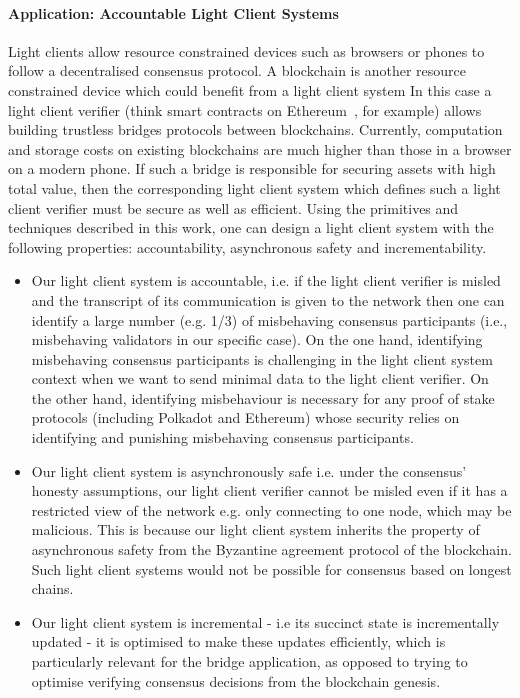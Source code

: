 \paragraph{Application: Accountable Light Client Systems} %
Light clients allow resource constrained devices such as browsers or phones to follow a decentralised 
consensus protocol. A blockchain is another resource constrained device which could benefit from a light client system In this case a light client verifier (think smart contracts on 
Ethereum~\cite{ethereum}, for example) allows building trustless bridges protocols between blockchains. %
Currently, computation and storage 
costs on existing blockchains are much higher than those in a browser on a modern phone. If such a bridge is responsible for securing assets with high total value, 
then the corresponding light client system which defines such a light client verifier must be secure as well as efficient. Using the primitives and techniques described in this work, 
one can design a light client system with the following properties: accountability, asynchronous safety and incrementability.  

\begin{itemize}
\item Our light client system is accountable, i.e. if the light client verifier is misled and the transcript of its communication is given to the network then one can identify a large 
number (e.g. 1/3) of misbehaving consensus participants (i.e., misbehaving validators in our specific case). On the one hand, identifying misbehaving consensus participants 
is challenging in the light client system context when we want to send minimal data to the light client verifier. On the other hand, 
identifying misbehaviour is necessary for any proof of stake protocols (including Polkadot and Ethereum) 
whose security relies on identifying and punishing misbehaving consensus participants. 
\item Our light client system is asynchronously safe i.e. under the consensus' honesty assumptions, our light client verifier cannot be misled even if it has a restricted view of the 
network e.g. only connecting to one node, which may be malicious. This is because our light client system inherits the property of asynchronous safety from the Byzantine agreement 
protocol of the blockchain. Such light client systems would not be possible for consensus based on longest chains.  
\item Our light client system is incremental - i.e its succinct state is incrementally updated - it is optimised to make these updates efficiently, which is particularly relevant for the bridge 
application, as opposed to trying to optimise verifying consensus decisions from the blockchain genesis.
\end{itemize}

